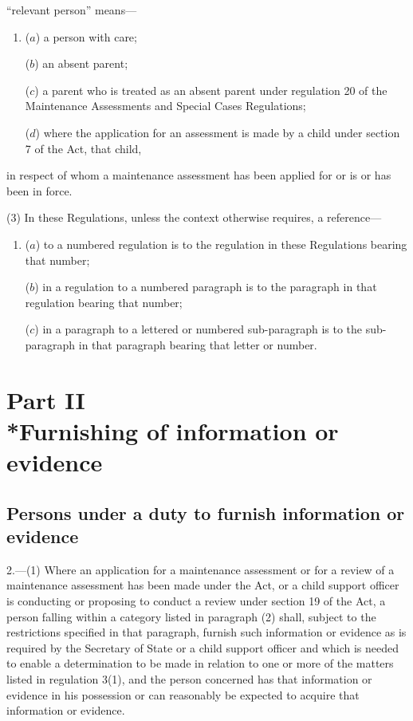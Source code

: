 \documentclass[a4paper,12pt]{article}
\begin{document}
\begin{enumerate}
“relevant person” means—
\begin{enumerate}\item[]
($a$) a person with care;

($b$) an absent parent;

($c$) a parent who is treated as an absent parent under regulation 20 of the Maintenance Assessments and Special Cases Regulations;

($d$) where the application for an assessment is made by a child under section 7 of the Act, that child,
\end{enumerate}
in respect of whom a maintenance assessment has been applied for or is or has been in force.
\end{enumerate}

(3) In these Regulations, unless the context otherwise requires, a reference—
\begin{enumerate}\item[]
($a$) to a numbered regulation is to the regulation in these Regulations bearing that number;

($b$) in a regulation to a numbered paragraph is to the paragraph in that regulation bearing that number;

($c$) in a paragraph to a lettered or numbered sub-paragraph is to the sub-paragraph in that paragraph bearing that letter or number.
\end{enumerate}

\section[Part II --- Furnishing of information or evidence]{Part II\\*Furnishing of information or evidence}

\renewcommand\parthead{--- Part II}

\subsection[2. Persons under a duty to furnish information or evidence]{Persons under a duty to furnish information or evidence}

2.—(1) Where an application for a maintenance assessment 
or for a review of a maintenance assessment  %
has been made under the Act, 
or a child support officer is conducting or proposing to conduct a review under section 19 of the Act,  %
a person falling within a category listed in paragraph (2) shall, subject to the restrictions specified in that paragraph, furnish such information or evidence as is required by the Secretary of State 
or a child support officer  %
and which is needed to enable a determination to be made in relation to one or more of the matters listed in regulation 3(1), and the person concerned has that information or evidence in his possession or can reasonably be expected to acquire that information or evidence.
\end{document}
